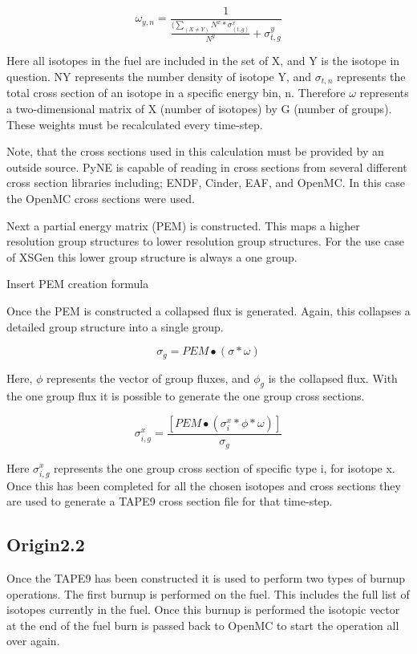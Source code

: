 \documentclass{article}
\begin{document}
$$\omega_{y,n}=\frac{1}{\frac{(\sum_(X\neq Y)N^x * σ_(t,g)^x}{N^y}+\sigma_{t,g}^y}$$

Here all isotopes in the fuel are included in the set of X, and Y is the isotope in question. NY represents the number density of isotope Y, and \begin{math}\sigma_{t,n}\end{math} represents the total cross section of an isotope in a specific energy bin, n. Therefore \begin{math}\omega\end{math} represents a two-dimensional matrix of X (number of isotopes) by G (number of groups). These weights must be recalculated every time-step. 

Note, that the cross sections used in this calculation must be provided by an outside source. PyNE is capable of reading in cross sections from several different cross section libraries including; ENDF, Cinder, EAF, and OpenMC. In this case the OpenMC cross sections were used. 

Next a partial energy matrix (PEM) is constructed. This maps a higher resolution group structures to lower resolution group structures. For the use case of XSGen this lower group structure is always a one group. 

Insert PEM creation formula

Once the PEM is constructed a collapsed flux is generated. Again, this collapses a detailed group structure into a single group. 

$$\sigma_g = PEM ∙(\sigma*\omega)$$

Here, \begin{math}\phi\end{math} represents the vector of group fluxes, and \begin{math}\phi_g\end{math} is the collapsed flux. With the one group flux it is possible to generate the one group cross sections. 

$$\sigma_{i,g}^x=\frac{[PEM∙(\sigma_i^x*\phi*\omega)]}{\sigma_g} $$

Here $\sigma_{i,g}^x$ represents the one group cross section of specific type i, for isotope x. Once this has been completed for all the chosen isotopes and cross sections they are used to generate a TAPE9 cross section file for that time-step. 

\subsection{Origin2.2}
Once the TAPE9 has been constructed it is used to perform two types of burnup operations. The first burnup is performed on the fuel. This includes the full list of isotopes currently in the fuel. Once this burnup is performed the isotopic vector at the end of the fuel burn is passed back to OpenMC to start the operation all over again.  
\end{document}
